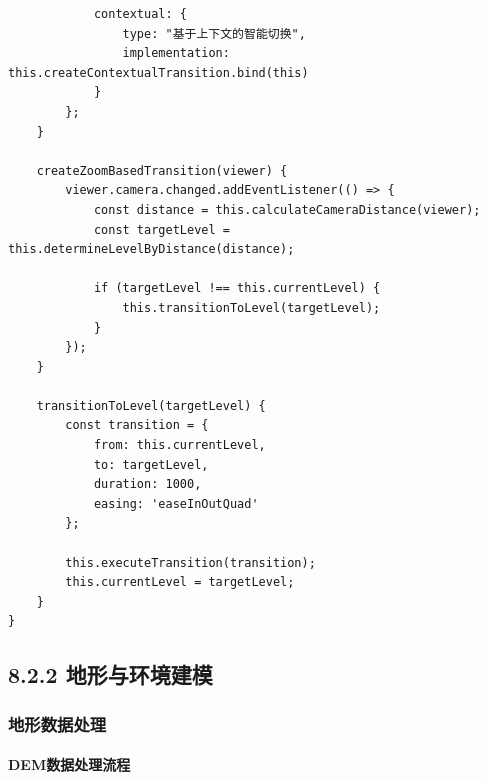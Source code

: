 \begin{lstlisting}
            contextual: {
                type: "基于上下文的智能切换",
                implementation: this.createContextualTransition.bind(this)
            }
        };
    }
    
    createZoomBasedTransition(viewer) {
        viewer.camera.changed.addEventListener(() => {
            const distance = this.calculateCameraDistance(viewer);
            const targetLevel = this.determineLevelByDistance(distance);
            
            if (targetLevel !== this.currentLevel) {
                this.transitionToLevel(targetLevel);
            }
        });
    }
    
    transitionToLevel(targetLevel) {
        const transition = {
            from: this.currentLevel,
            to: targetLevel,
            duration: 1000,
            easing: 'easeInOutQuad'
        };
        
        this.executeTransition(transition);
        this.currentLevel = targetLevel;
    }
}
\end{lstlisting}

\subsection{8.2.2
地形与环境建模}\label{ux5730ux5f62ux4e0eux73afux5883ux5efaux6a21}

\subsubsection{地形数据处理}\label{ux5730ux5f62ux6570ux636eux5904ux7406}

\paragraph{DEM数据处理流程}\label{demux6570ux636eux5904ux7406ux6d41ux7a0b}

